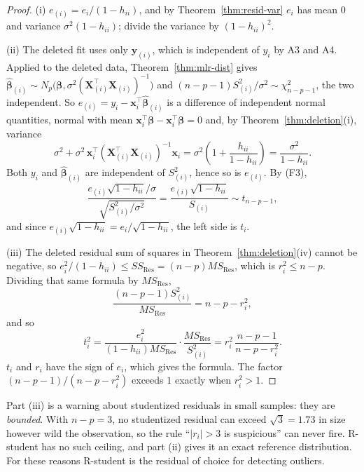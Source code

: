 \documentclass[11pt,a4paper]{article}
\numberwithin{equation}{section}
\theoremstyle{definition}
\begin{document}
\begin{proof}
(i) $e_{(i)} = e_i/(1 - h_{ii})$, and by Theorem~\ref{thm:resid-var} $e_i$ has mean $0$
and variance $\sigma^2(1 - h_{ii})$; divide the variance by $(1 - h_{ii})^2$.

(ii) The deleted fit uses only $\mathbf{y}_{(i)}$, which is independent of $y_i$ by A3 and
A4. Applied to the deleted data, Theorem~\ref{thm:mlr-dist} gives
$\hat{\boldsymbol\beta}_{(i)} \sim N_p\bigl(\boldsymbol\beta, \sigma^2(\mathbf{X}_{(i)}^\top\mathbf{X}_{(i)})^{-1}\bigr)$
and $(n - p - 1)S^2_{(i)}/\sigma^2 \sim \chi^2_{n - p - 1}$, the two independent. So
$e_{(i)} = y_i - \mathbf{x}_i^\top\hat{\boldsymbol\beta}_{(i)}$ is a difference of independent
normal quantities, normal with mean $\mathbf{x}_i^\top\boldsymbol\beta - \mathbf{x}_i^\top\boldsymbol\beta = 0$
and, by Theorem~\ref{thm:deletion}(i), variance
\[
\sigma^2 + \sigma^2\,\mathbf{x}_i^\top(\mathbf{X}_{(i)}^\top\mathbf{X}_{(i)})^{-1}\mathbf{x}_i
= \sigma^2\left(1 + \frac{h_{ii}}{1 - h_{ii}}\right) = \frac{\sigma^2}{1 - h_{ii}} .
\]
Both $y_i$ and $\hat{\boldsymbol\beta}_{(i)}$ are independent of $S^2_{(i)}$, hence so is
$e_{(i)}$. By (F3),
\[
\frac{e_{(i)}\sqrt{1 - h_{ii}}/\sigma}{\sqrt{S^2_{(i)}/\sigma^2}}
= \frac{e_{(i)}\sqrt{1 - h_{ii}}}{S_{(i)}} \sim t_{n - p - 1} ,
\]
and since $e_{(i)}\sqrt{1 - h_{ii}} = e_i/\sqrt{1 - h_{ii}}$, the left side is $t_i$.

(iii) The deleted residual sum of squares in Theorem~\ref{thm:deletion}(iv) cannot be
negative, so $e_i^2/(1 - h_{ii}) \le SS_{\mathrm{Res}} = (n - p)MS_{\mathrm{Res}}$, which is
$r_i^2 \le n - p$. Dividing that same formula by $MS_{\mathrm{Res}}$,
\[
\frac{(n - p - 1)S^2_{(i)}}{MS_{\mathrm{Res}}} = n - p - r_i^2 ,
\]
and so
\[
t_i^2 = \frac{e_i^2}{(1 - h_{ii})MS_{\mathrm{Res}}}\cdot\frac{MS_{\mathrm{Res}}}{S^2_{(i)}}
= r_i^2\,\frac{n - p - 1}{n - p - r_i^2} .
\]
$t_i$ and $r_i$ have the sign of $e_i$, which gives the formula. The factor
$(n - p - 1)/(n - p - r_i^2)$ exceeds $1$ exactly when $r_i^2 > 1$.
\end{proof}

Part (iii) is a warning about studentized residuals in small samples: they are
\emph{bounded}. With $n - p = 3$, no studentized residual can exceed $\sqrt3 = 1.73$ in
size however wild the observation, so the rule ``$|r_i| > 3$ is suspicious'' can never
fire. R-student has no such ceiling, and part (ii) gives it an exact reference
distribution. For these reasons R-student is the residual of choice for detecting
outliers.
\end{document}
